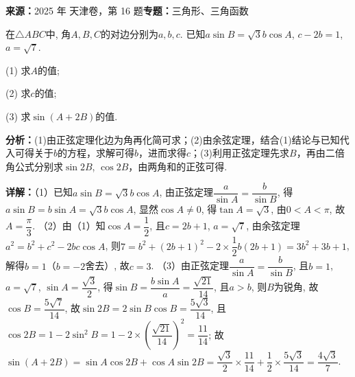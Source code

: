 \begin{question}[points=15]
\textbf{来源：}2025 年 天津卷，第 16 题\quad \textbf{专题：}三角形、三角函数\par
在$\triangle ABC$中, 角$A, B, C$的对边分别为$a, b, c$. 已知$a\sin B = \sqrt{3}b\cos A$, $c - 2b = 1$, $a = \sqrt{7}$.

(1) 求$A$的值;

(2) 求$c$的值;

(3) 求$\sin(A + 2B)$的值.
\begin{solution}

\textbf{分析：}(1)由正弦定理化边为角再化简可求；(2)由余弦定理，结合(1)结论与已知代入可得关于$b$的方程，求解可得$b$，进而求得$c$；(3)利用正弦定理先求$B$，再由二倍角公式分别求$\sin 2B$, $\cos 2B$，由两角和的正弦可得.

\textbf{详解：}（1）已知$a\sin B = \sqrt{3}b\cos A$, 由正弦定理$\dfrac{a}{\sin A} = \dfrac{b}{\sin B}$, 得$a\sin B = b\sin A = \sqrt{3}b\cos A$, 显然$\cos A \neq 0$, 得$\tan A = \sqrt{3}$, 由$0 < A < \pi$, 故$A = \dfrac{\pi}{3}$.
（2）由（1）知$\cos A = \dfrac{1}{2}$, 且$c = 2b + 1$, $a = \sqrt{7}$, 由余弦定理$a^2 = b^2 + c^2 - 2bc\cos A$, 则$7 = b^2 + (2b+1)^2 - 2 \times \dfrac{1}{2} b(2b+1) = 3b^2 + 3b + 1$, 解得$b = 1$（$b = -2$舍去）, 故$c = 3$.
（3）由正弦定理$\dfrac{a}{\sin A} = \dfrac{b}{\sin B}$, 且$b = 1$, $a = \sqrt{7}$, $\sin A = \dfrac{\sqrt{3}}{2}$, 得$\sin B = \dfrac{b\sin A}{a} = \dfrac{\sqrt{21}}{14}$, 且$a > b$, 则$B$为锐角, 故$\cos B = \dfrac{5\sqrt{7}}{14}$, 故$\sin 2B = 2\sin B\cos B = \dfrac{5\sqrt{3}}{14}$, 且$\cos 2B = 1 - 2\sin^2 B = 1 - 2 \times \left(\dfrac{\sqrt{21}}{14}\right)^2 = \dfrac{11}{14}$; 故$\sin(A + 2B) = \sin A \cos 2B + \cos A \sin 2B = \dfrac{\sqrt{3}}{2} \times \dfrac{11}{14} + \dfrac{1}{2} \times \dfrac{5\sqrt{3}}{14} = \dfrac{4\sqrt{3}}{7}$.
\end{solution}
\end{question}

